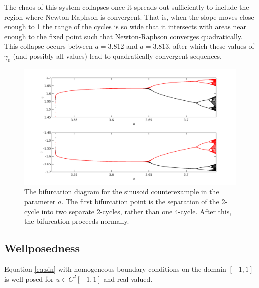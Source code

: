 \documentclass{article}
\begin{document}
The chaos of this system collapses once it spreads out sufficiently to include the region where Newton-Raphson is convergent.
That is, when the slope moves close enough to 1 the range of the cycles is so wide that it intersects with areas near enough to the fixed point such that Newton-Raphson converges quadratically.
This collapse occurs between $a = 3.812$ and $a=3.813$, after which these values of $\gamma_0$ (and possibly all values) lead to quadratically convergent sequences.

\begin{figure}
\includegraphics[width=\textwidth]{bifurcation_all.png}
\caption{The bifurcation diagram for the sinusoid counterexample in the parameter $a$.
The first bifurcation point is the separation of the 2-cycle into two separate 2-cycles, rather than one 4-cycle.
After this, the bifurcation proceeds normally.}
\label{fig:bifurc}
\end{figure}

\subsection{Wellposedness}

\begin{lemma}[Wellposedness]
Equation \ref{eq:sin} with homogeneous boundary conditions on the domain $[-1,1]$ is well-posed for $u \in C^2[-1,1]$ and real-valued.
\end{lemma}
\end{document}
